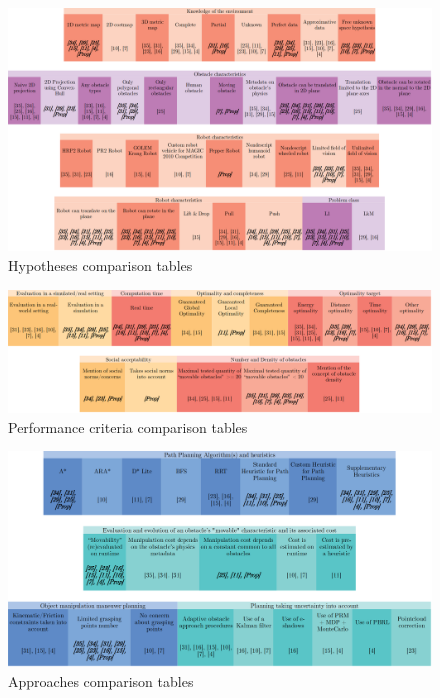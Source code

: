 \begin{figure}[H]
\centering
\includegraphics[width=\linewidth]{Comparison_Table/a_hypotheses}
\decoRule
\caption[Hypotheses comparison tables]{Hypotheses comparison tables}
\label{fig:hypotheses_comparison_tables}
\end{figure}

\begin{figure}[H]
\centering
\includegraphics[width=\linewidth]{Comparison_Table/c_performance}
\decoRule
\caption[Performance criteria comparison tables]{Performance criteria comparison tables}
\label{fig:performance_comparison_tables}
\end{figure}

\begin{figure}[H]
\centering
\includegraphics[width=\linewidth]{Comparison_Table/b_approaches}
\decoRule
\caption[Approaches comparison tables]{Approaches comparison tables}
\label{fig:approaches_comparison_tables}
\end{figure}

